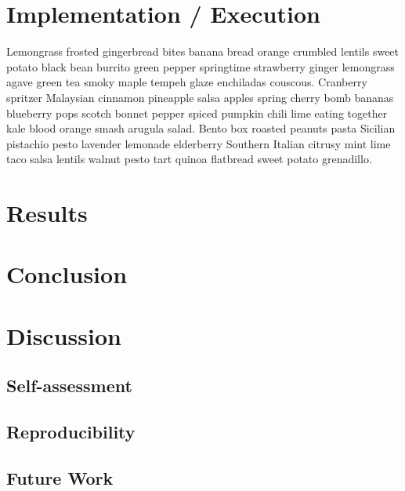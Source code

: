 
%
\chapter{Implementation / Execution}%

Lemongrass frosted gingerbread bites banana bread orange crumbled lentils sweet potato black bean burrito green pepper springtime strawberry ginger lemongrass agave green tea smoky maple tempeh glaze enchiladas couscous. Cranberry spritzer Malaysian cinnamon pineapple salsa apples spring cherry bomb bananas blueberry pops scotch bonnet pepper spiced pumpkin chili lime eating together kale blood orange smash arugula salad. Bento box roasted peanuts pasta Sicilian pistachio pesto lavender lemonade elderberry Southern Italian citrusy mint lime taco salsa lentils walnut pesto tart quinoa flatbread sweet potato grenadillo. 


%


%
\chapter{Results}%



%
\chapter{Conclusion}%



%
\chapter{Discussion}%



\section{Self-assessment}

\section{Reproducibility}

\section{Future Work}

